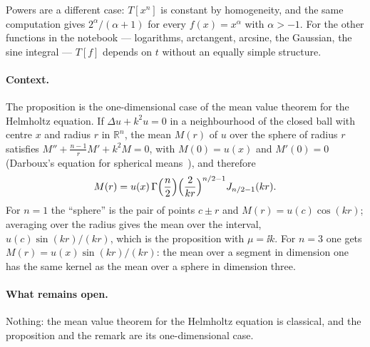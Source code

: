 Powers are a different case: $T[x^n]$ is constant by homogeneity, and the same
computation gives $2^\alpha/(\alpha+1)$ for every $f(x)=x^\alpha$ with
$\alpha>-1$. For the other functions in the notebook --- logarithms,
arctangent, arcsine, the Gaussian, the sine integral --- $T[f]$ depends on $t$
without an equally simple structure.

\paragraph{Context.}
The proposition is the one-dimensional case of the mean value theorem for the
Helmholtz equation. If $\Delta u+k^2u=0$ in a neighbourhood of the closed ball
with centre $x$ and radius $r$ in $\mathbb{R}^n$, the mean $M(r)$ of $u$ over
the sphere of radius $r$ satisfies $M''+\frac{n-1}{r}M'+k^2M=0$, with
$M(0)=u(x)$ and $M'(0)=0$ (Darboux's equation for spherical
means~\cite{john1955}), and therefore
\[
  M(r)=u(x)\,\Gamma\Bigl(\frac n2\Bigr)\Bigl(\frac{2}{kr}\Bigr)^{n/2-1}
  J_{n/2-1}(kr).
\]
For $n=1$ the ``sphere'' is the pair of points $c\pm r$ and
$M(r)=u(c)\cos(kr)$; averaging over the radius gives the mean over the
interval, $u(c)\sin(kr)/(kr)$, which is the proposition with $\mu=\ii k$. For
$n=3$ one gets $M(r)=u(x)\sin(kr)/(kr)$: the mean over a segment in dimension
one has the same kernel as the mean over a sphere in dimension three.

\paragraph{What remains open.}
Nothing: the mean value theorem for the Helmholtz equation is classical, and
the proposition and the remark are its one-dimensional case.
